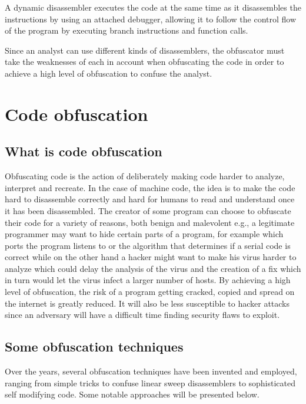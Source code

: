 \documentclass[11pt,twoside]{eitExjobb}
\begin{document}
A dynamic disassembler executes the code at the same time as it disassembles the instructions by using an attached debugger, allowing it to follow the control flow of the program by executing branch instructions and function calls. 

Since an analyst can use different kinds of disassemblers, the obfuscator must take the weaknesses of each in account when obfuscating the code in order to achieve a high level of obfuscation to confuse the analyst.

\chapter{Code obfuscation}
\section{What is code obfuscation}
Obfuscating code is the action of deliberately making code harder to analyze, interpret and recreate. In the case of machine code, the idea is to make the code hard to disassemble correctly and hard for humans to read and understand once it has been disassembled. The creator of some program can choose to obfuscate their code for a variety of reasons, both benign and malevolent e.g., a legitimate programmer may want to hide certain parts of a program, for example which ports the program listens to or the algorithm that determines if a serial code is correct while on the other hand  a hacker might  want to make his virus harder to analyze which could delay the analysis of the virus and the creation of a fix which in turn would let the virus infect a larger number of hosts. By achieving a high level of obfuscation, the risk of a program getting cracked, copied and spread on the internet is greatly reduced. It will also be less susceptible to hacker attacks since an adversary will have a difficult time finding security flaws to exploit.

\section{Some obfuscation techniques}
Over the years, several obfuscation techniques have been invented and employed, ranging from simple tricks to confuse linear sweep disassemblers to sophisticated self modifying code. Some notable approaches will be presented below.
\end{document}
